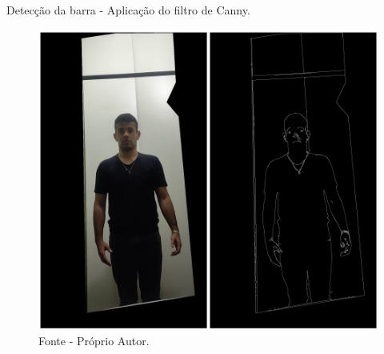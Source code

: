 \begin{frame}{Detecção da barra - Aplicação do filtro de Canny.}
    \begin{figure}[!ht]
    \centering
    \includegraphics[scale=0.45]{img/desenvolvimento/detectaBarra/canny.png}
    \caption*{Fonte - Próprio Autor.}
    \end{figure}
\end{frame}



